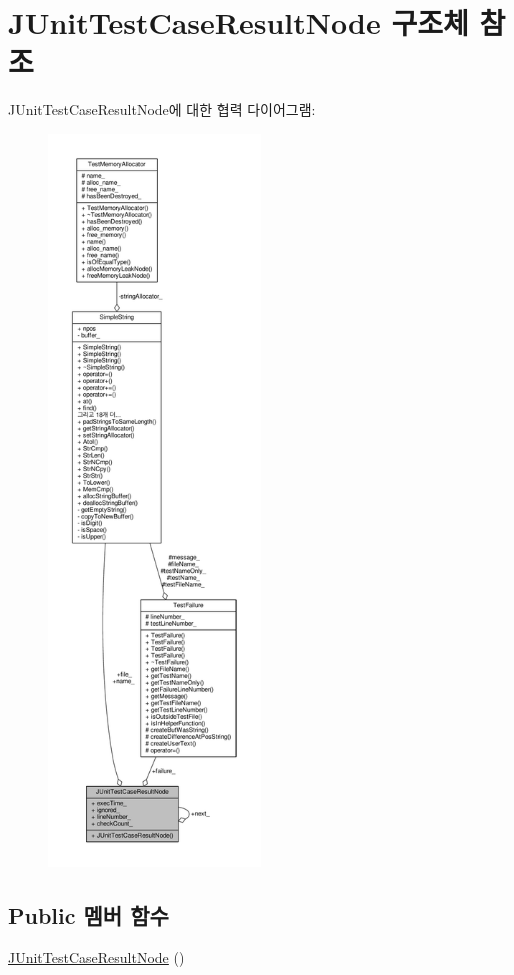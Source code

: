 \hypertarget{struct_j_unit_test_case_result_node}{}\section{J\+Unit\+Test\+Case\+Result\+Node 구조체 참조}
\label{struct_j_unit_test_case_result_node}


J\+Unit\+Test\+Case\+Result\+Node에 대한 협력 다이어그램\+:
\nopagebreak
\begin{figure}[H]
\begin{center}
\leavevmode
\includegraphics[height=550pt]{struct_j_unit_test_case_result_node__coll__graph}
\end{center}
\end{figure}
\subsection*{Public 멤버 함수}
\begin{DoxyCompactItemize}
\item 
\hyperlink{struct_j_unit_test_case_result_node_a2de415d0e627729e29c37b7eeb124b93}{J\+Unit\+Test\+Case\+Result\+Node} ()
\end{DoxyCompactItemize}
